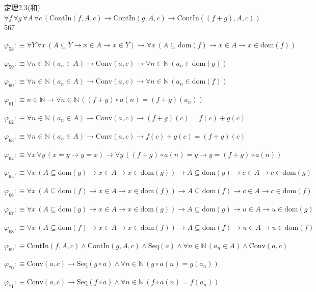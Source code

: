 \begin{fullproof}{定理2.3(和)}{$\forall f\,\forall g\,\forall A\,\forall c\,(\mathrm{ContIn}(f,A,c) \to \mathrm{ContIn}(g,A,c) \to \mathrm{ContIn}((f + g),A,c))$}{567}
\begin{abbrevlist}
\item $\varphi_{58} :\equiv \forall Y\,\forall x\,(A \subseteq Y \to x \in A \to x \in Y) \to \forall x\,(A \subseteq \mathrm{dom}(f) \to x \in A \to x \in \mathrm{dom}(f))$
\item $\varphi_{59} :\equiv \forall n \in \mathbb{N}\,(a_{n} \in A) \to \mathrm{Conv}(a,c) \to \forall n \in \mathbb{N}\,(a_{n} \in \mathrm{dom}(g))$
\item $\varphi_{60} :\equiv \forall n \in \mathbb{N}\,(a_{n} \in A) \to \mathrm{Conv}(a,c) \to \forall n \in \mathbb{N}\,(a_{n} \in \mathrm{dom}(f))$
\item $\varphi_{61} :\equiv n \in \mathbb{N} \to \forall n \in \mathbb{N}\,((f + g) \circ a(n) = (f + g)(a_{n}))$
\item $\varphi_{62} :\equiv \forall n \in \mathbb{N}\,(a_{n} \in A) \to \mathrm{Conv}(a,c) \to (f + g)(c) = f(c) + g(c)$
\item $\varphi_{63} :\equiv \forall n \in \mathbb{N}\,(a_{n} \in A) \to \mathrm{Conv}(a,c) \to f(c) + g(c) = (f + g)(c)$
\item $\varphi_{64} :\equiv \forall x\,\forall y\,(x = y \to y = x) \to \forall y\,((f + g) \circ a(n) = y \to y = (f + g) \circ a(n))$
\item $\varphi_{65} :\equiv \forall x\,(A \subseteq \mathrm{dom}(g) \to x \in A \to x \in \mathrm{dom}(g)) \to A \subseteq \mathrm{dom}(g) \to c \in A \to c \in \mathrm{dom}(g)$
\item $\varphi_{66} :\equiv \forall x\,(A \subseteq \mathrm{dom}(f) \to x \in A \to x \in \mathrm{dom}(f)) \to A \subseteq \mathrm{dom}(f) \to c \in A \to c \in \mathrm{dom}(f)$
\item $\varphi_{67} :\equiv \forall x\,(A \subseteq \mathrm{dom}(g) \to x \in A \to x \in \mathrm{dom}(g)) \to A \subseteq \mathrm{dom}(g) \to u \in A \to u \in \mathrm{dom}(g)$
\item $\varphi_{68} :\equiv \forall x\,(A \subseteq \mathrm{dom}(f) \to x \in A \to x \in \mathrm{dom}(f)) \to A \subseteq \mathrm{dom}(f) \to u \in A \to u \in \mathrm{dom}(f)$
\item $\varphi_{69} :\equiv \mathrm{ContIn}(f,A,c) \land \mathrm{ContIn}(g,A,c) \land \mathrm{Seq}(a) \land \forall n \in \mathbb{N}\,(a_{n} \in A) \land \mathrm{Conv}(a,c)$
\item $\varphi_{70} :\equiv \mathrm{Conv}(a,c) \to \mathrm{Seq}(g \circ a) \land \forall n \in \mathbb{N}\,(g \circ a(n) = g(a_{n}))$
\item $\varphi_{71} :\equiv \mathrm{Conv}(a,c) \to \mathrm{Seq}(f \circ a) \land \forall n \in \mathbb{N}\,(f \circ a(n) = f(a_{n}))$

\end{abbrevlist}
\end{fullproof}
